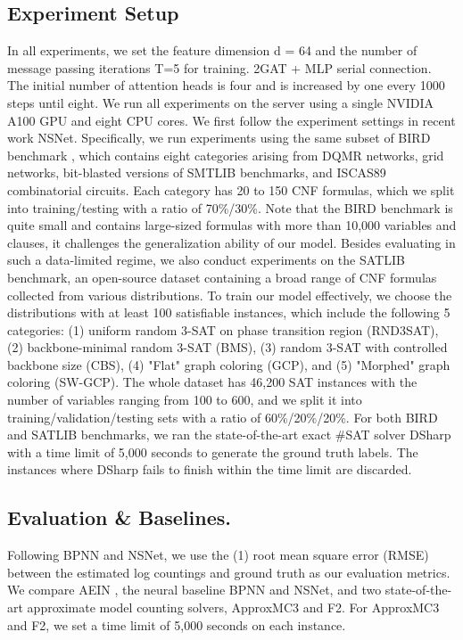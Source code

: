 \subsection{Experiment Setup}
In all experiments, we set the feature dimension d = 64 and the number of message passing iterations T=5 for training. 2GAT + MLP serial connection. The initial number of attention heads is four and is increased by one every 1000 steps until eight. We run all experiments on the server using a single NVIDIA A100 GPU and eight CPU cores.
We first follow the experiment settings in recent work NSNet. Specifically, we run experiments using the same subset of BIRD benchmark\cite{A19} , which contains eight categories arising from DQMR networks, grid networks, bit-blasted versions of SMTLIB benchmarks, and ISCAS89 combinatorial circuits. Each category has 20 to 150 CNF formulas, which we split into training/testing with a ratio of 70\%/30\%. Note that the BIRD benchmark is quite small and contains large-sized formulas with more than 10,000 variables and clauses, it challenges the generalization ability of our model. Besides evaluating in such a data-limited regime, we also conduct experiments on the SATLIB benchmark, an open-source dataset containing a broad range of CNF formulas collected from various distributions. To train our model effectively, we choose the distributions with at least 100 satisfiable instances, which include the following 5 categories: (1) uniform random 3-SAT on phase transition region (RND3SAT), (2) backbone-minimal random 3-SAT (BMS), (3) random 3-SAT with controlled backbone size (CBS), (4) "Flat" graph coloring (GCP), and (5) "Morphed" graph coloring (SW-GCP). The whole dataset has 46,200 SAT instances with the number of variables ranging from 100 to 600, and we split it into training/validation/testing sets with a ratio of 60\%/20\%/20\%. For both BIRD and SATLIB benchmarks, we ran the state-of-the-art exact \#SAT solver DSharp\cite{B7} with a time limit of 5,000 seconds to generate the ground truth labels. The instances where DSharp fails to finish within the time limit are discarded.

\subsection{Evaluation \& Baselines.}
Following BPNN and NSNet, we use the (1) root mean square error (RMSE) between the estimated log countings and ground truth as our evaluation metrics. We compare AEIN , the neural baseline BPNN and NSNet, and two state-of-the-art approximate model counting solvers, ApproxMC3\cite{A19} and F2\cite{B8}. For ApproxMC3 and F2, we set a time limit of 5,000 seconds on each instance.
